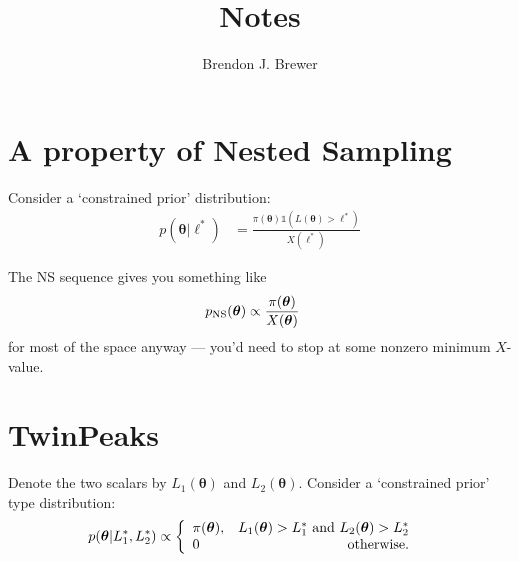 \documentclass[a4paper, 12pt]{article}
\title{Notes}
\author{Brendon J. Brewer}
\date{}
\newcommand{\btheta}{\boldsymbol{\theta}}
\begin{document}
\maketitle

\setlength{\parindent}{0pt}
\setlength{\parskip}{8pt}

\section*{A property of Nested Sampling}
Consider a `constrained prior' distribution:
\begin{align}
p(\btheta | \ell^*) &=
    \frac{\pi(\btheta)\mathds{1}(L(\btheta) > \ell^*)}
         {X(\ell^*)}
\end{align}

The NS sequence gives you something like
\begin{align}
p_{\rm NS}(\btheta) &\propto \frac{\pi(\btheta)}{X(\btheta)}
\end{align}
for most of the space anyway --- you'd need to stop at some
nonzero minimum $X$-value.

\section*{TwinPeaks}
Denote the two scalars by $L_1(\btheta)$ and $L_2(\btheta)$.
Consider a `constrained prior' type distribution:
\begin{align}
p(\btheta | L_1^*, L_2^*) &\propto
    \left\{
        \begin{array}{lr}
            \pi(\btheta), & L_1(\btheta) > L_1^* \textnormal{ and }
                            L_2(\btheta) > L_2^* \\
            0             & \textnormal{otherwise}.
        \end{array}
    \right.
\end{align}

\end{document}
